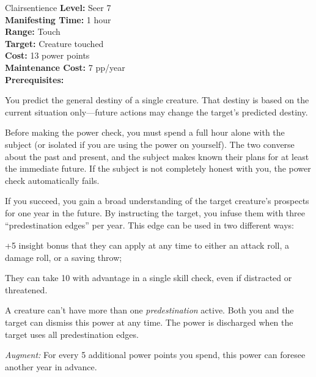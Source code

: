 {Clairsentience}
{
	\textbf{Level:}
	Seer 7\\
	\textbf{Manifesting Time:}
	1 hour\\
	\textbf{Range:}
	Touch\\
	\textbf{Target:}
	Creature touched\\
	\textbf{Cost:}
	13 power points\\
	\textbf{Maintenance Cost:}
	7 pp/year\\
	\textbf{Prerequisites:}
	\\
}
{
	You predict the general destiny of a single creature. That destiny is based on the current situation only---future actions may change the target's predicted destiny.

	Before making the power check, you must spend a full hour alone with the subject (or isolated if you are using the power on yourself). The two converse about the past and present, and the subject makes known their plans for at least the immediate future. If the subject is not completely honest with you, the power check automatically fails.

	If you succeed, you gain a broad understanding of the target creature's prospects for one year in the future. By instructing the target, you infuse them with three ``predestination edges'' per year. This edge can be used in two different ways:
	\begin{enumerate*}
	\item +5 insight bonus that they can apply at any time to either an attack roll, a damage roll, or a saving throw;
	\item They can take 10 with advantage in a single skill check, even if distracted or threatened.
	\end{enumerate*}

	A creature can't have more than one \emph{predestination} active. Both you and the target can dismiss this power at any time. The power is discharged when the target uses all predestination edges.

	\textit{Augment:} For every 5 additional power points you spend, this power can foresee another year in advance.
}